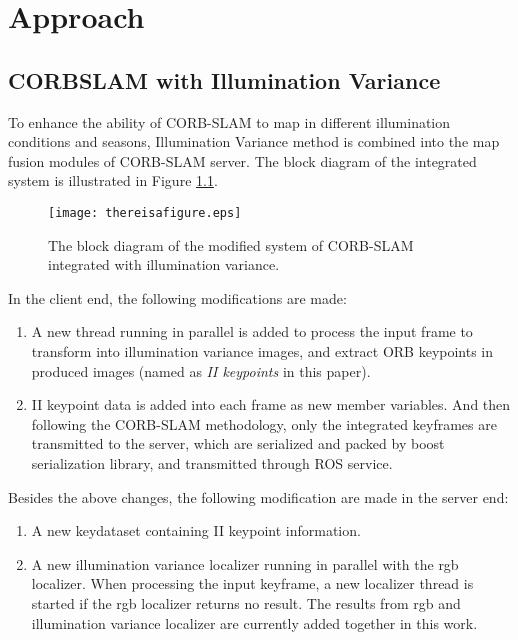 
\chapter{Approach}

\section{CORBSLAM with Illumination Variance}

To enhance the ability of CORB-SLAM to map in different illumination conditions and seasons, Illumination Variance method is combined into the map fusion modules of CORB-SLAM server. The block diagram of the integrated system is illustrated in Figure \ref{fig:coislamoverview}.

\begin{figure}[H]
	\centering
	\texttt{[image: thereisafigure.eps]}
	\caption{The block diagram of the modified system of CORB-SLAM integrated with illumination variance.}
	\label{fig:coislamoverview} 
\end{figure}

In the client end, the following modifications are made:

\begin{enumerate}
	\item A new thread running in parallel is added to process the input frame to transform into illumination variance images, and extract ORB keypoints in produced images (named as \textsl{II keypoints} in this paper).
	\item II keypoint data is added into each frame as new member variables. And then following the CORB-SLAM methodology, only the integrated keyframes are transmitted to the server,  which are serialized and packed by boost serialization library, and transmitted through ROS service.
\end{enumerate}

Besides the above changes, the following modification are made in the server end:

\begin{enumerate}
	\item A new keydataset containing II keypoint information. 
	\item A new illumination variance localizer running in parallel with the rgb localizer. When processing the input keyframe, a new localizer thread is started if the rgb localizer returns no result. The results from rgb and illumination variance localizer are currently added together in this work.
\end{enumerate}

